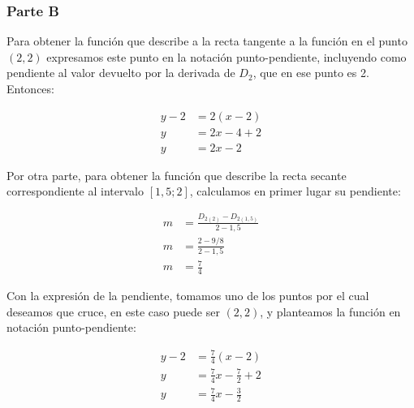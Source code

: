 \subsubsection*{Parte B}

\begin{center}
\end{center}

Para obtener la función que describe a la recta tangente a la función en el punto $(2, 2)$ expresamos este punto en la notación punto-pendiente, incluyendo como pendiente al valor devuelto por la derivada de $D_2$, que en ese punto es 2. Entonces:

\begin{align*}
    y-2 &= 2(x-2)\\
    y &= 2x - 4 + 2\\
    y &= 2x - 2
\end{align*}

Por otra parte, para obtener la función que describe la recta secante correspondiente al intervalo $[1,5; 2]$, calculamos en primer lugar su pendiente:

\begin{align*}
    m &= \frac{D_{2(2)} - D_{2(1,5)}}{2 - 1,5}\\
    m &= \frac{2 - 9/8}{2 - 1,5}\\
    m &= \frac{7}{4}
\end{align*}

Con la expresión de la pendiente, tomamos uno de los puntos por el cual deseamos que cruce, en este caso puede ser $(2, 2)$, y planteamos la función en notación punto-pendiente:

\begin{align*}
    y-2 &= \frac{7}{4}(x-2)\\
    y &= \frac{7}{4}x - \frac{7}{2} + 2\\
    y &= \frac{7}{4}x - \frac{3}{2}
\end{align*}

